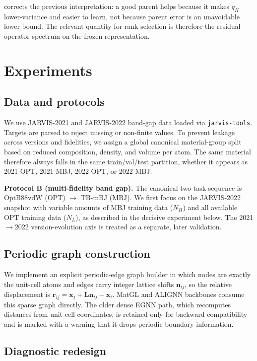 \documentclass{article}
\theoremstyle{plain}
\theoremstyle{definition}
\theoremstyle{remark}
\begin{document}
 corrects the previous interpretation: a good parent helps because it makes $q_H$ lower-variance and easier to learn, not because parent error is an unavoidable lower bound. The relevant quantity for rank selection is therefore the residual operator spectrum on the frozen representation.

\section{Experiments}

\subsection{Data and protocols}

We use JARVIS-2021 and JARVIS-2022 band-gap data loaded via \texttt{jarvis-tools}. Targets are parsed to reject missing or non-finite values. To prevent leakage across versions and fidelities, we assign a global canonical material-group split based on reduced composition, density, and volume per atom. The same material therefore always falls in the same train/val/test partition, whether it appears as 2021 OPT, 2021 MBJ, 2022 OPT, or 2022 MBJ.

\textbf{Protocol B (multi-fidelity band gap).} The canonical two-task sequence is OptB88vdW (OPT) $\to$ TB-mBJ (MBJ). We first focus on the JARVIS-2022 snapshot with variable amounts of MBJ training data ($N_H$) and all available OPT training data ($N_L$), as described in the decisive experiment below. The 2021$\to$2022 version-evolution axis is treated as a separate, later validation.

\subsection{Periodic graph construction}

We implement an explicit periodic-edge graph builder in which nodes are exactly the unit-cell atoms and edges carry integer lattice shifts $\mathbf n_{ij}$, so the relative displacement is $\mathbf r_{ij}=\mathbf x_j + \mathbf L\mathbf n_{ij} - \mathbf x_i$. MatGL and ALIGNN backbones consume this sparse graph directly. The older dense EGNN path, which recomputes distances from unit-cell coordinates, is retained only for backward compatibility and is marked with a warning that it drops periodic-boundary information.

\subsection{Diagnostic redesign}
\end{document}
